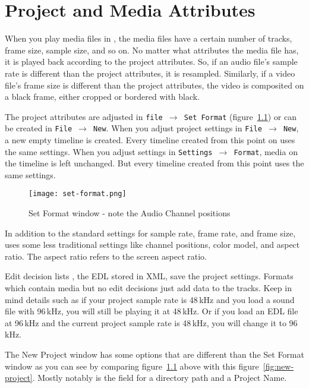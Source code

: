 \chapter{Project and Media Attributes}%
\label{cha:project_and_media_attributes}

When you play media files in \CGG{}, the media files have a certain
number of tracks, frame size, sample size, and so on.  No matter
what attributes the media file has, it is played back according to
the project attributes.  So, if an audio file's sample rate is
different than the project attributes, it is resampled.  Similarly,
if a video file's frame size is different than the project
attributes, the video is composited on a black frame, either cropped
or bordered with black.

The project attributes are adjusted in \texttt{file $\rightarrow$
Set Format} (figure~\ref{fig:set-format}) or can be created in
\texttt{File $\rightarrow$ New}.  When you adjust project settings
in \texttt{File $\rightarrow$ New}, a new empty timeline is created.
Every timeline created from this point on uses the same settings.
When you adjust settings in \texttt{Settings $\rightarrow$ Format},
media on the timeline is left unchanged.  But every timeline created
from this point uses the same settings.

\begin{figure}[htpb]\centering
\texttt{[image: set-format.png]}
  \caption{Set Format window - note the Audio Channel positions}
  \label{fig:set-format}
\end{figure}

In addition to the standard settings for sample rate, frame rate,
and frame size, \CGG{} uses some less traditional settings like
channel positions, color model, and aspect ratio.  The aspect ratio
refers to the screen aspect ratio.

Edit decision lists , the EDL stored in XML, save the project
settings.  Formats which contain media but no edit decisions just
add data to the tracks.  Keep in mind details such as if your
project sample rate is 48\,kHz and you load a sound file with
96\,kHz, you will still be playing it at 48\,kHz.  Or if you load an
EDL file at 96\,kHz and the current project sample rate is 48\,kHz,
you will change it to 96\,kHz.

The New Project window has some options that are different than the
Set Format window as you can see by comparing
figure~\ref{fig:set-format} above with this
figure~\ref{fig:new-project}.  Mostly notably is the field for a
directory path and a Project Name.

